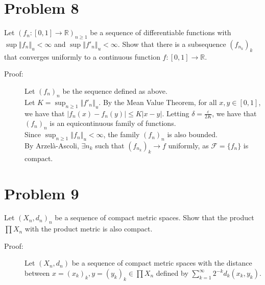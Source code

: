 \documentclass[10pt]{extarticle}
\newcommand{\R}{\mathbb{R}}
\newcommand{\norm}[1]{\left\Vert #1\right\Vert}
\begin{document}
  \section{Problem 8}%
  Let $(f_n: [0,1]\rightarrow \R)_{n\geq 1}$ be a sequence of differentiable functions with $\sup\norm{f_n}_u < \infty$ and $\sup\norm{f'_n}_u < \infty$. Show that there is a subsequence $\left(f_{n_k}\right)_k$ that converges uniformly to a continuous function $f: [0,1]\rightarrow \R$.
  \begin{description}
    \item[Proof:] Let $(f_n)_n$ be the sequence defined as above.\\

      Let $K = \sup_{n\geq 1}\norm{f'_n}_u$. By the Mean Value Theorem, for all $x,y\in [0,1]$, we have that $|f_n(x)-f_n(y)| \leq K|x-y|$. Letting $\delta = \frac{\varepsilon}{2K}$, we have that $(f_n)_n$ is an equicontinuous family of functions.\\

      Since $\sup_{n\geq 1}\norm{f_n}_u < \infty$, the family $(f_n)_n$ is also bounded.\\

      By Arzelà-Ascoli, $\exists n_k$ such that $\left(f_{n_k}\right)_k \rightarrow f$ uniformly, as $\mathcal{F} = \{f_n\}$ is compact.
  \end{description}
  \section{Problem 9}%
  Let $(X_n,d_n)_n$ be a sequence of compact metric spaces. Show that the product $\prod X_n$ with the product metric is also compact.
  \begin{description}
    \item[Proof:] Let $(X_n,d_n)$ be a sequence of compact metric spaces with the distance between $x=(x_k)_k,y=(y_k)_k\in \prod X_n$ defined by $\sum_{k=1}^{\infty}2^{-k}d_{k}(x_k,y_k)$.
  \end{description}
\end{document}
